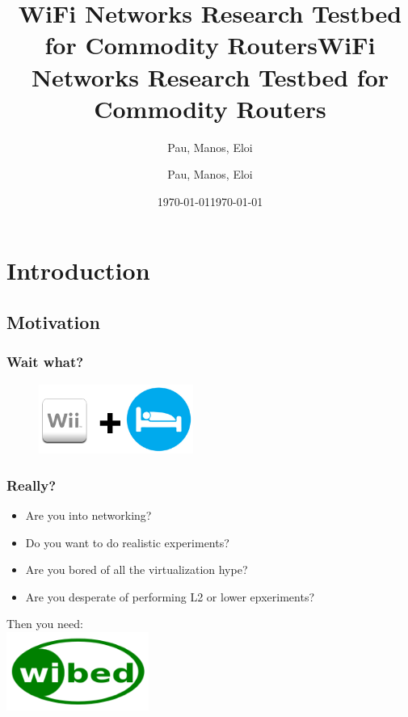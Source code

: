 \documentclass[usepdftitle=false,13pt]{beamer}
\title[WiFi Networks Research Testbed for Commodity Routers]{WiFi Networks Research Testbed for Commodity Routers}
\author[{Pau, Manos, Eloi}]{Pau, Manos, Eloi}
\institute[{UPC, Guifi.net}]{UPC, Guifi.net}
\date[\today]{\today}
\begin{document}
\title[WiBed\hspace{20em}\insertframenumber/\inserttotalframenumber]{WiFi Networks Research Testbed for Commodity Routers}  
\author[Pau@Guifi,\{Manos,Eloi\}@UPC ]{ Pau, Manos, Eloi\\
 }

\date{\today} 

\frame{\titlepage}




\section{Introduction}
\subsection{Motivation}

\begin{frame}\frametitle{Wait what?}

\begin{figure}[h!]
\begin{center}
\includegraphics[width=0.45\textwidth]{pic/Wiibed}
\end{center}
\end{figure}

\end{frame}



\begin{frame}\frametitle{Really?}

	\begin{itemize}
		\item Are you into networking?
		\pause
		\item Do you want to do realistic experiments?
		\pause
		\item Are you bored of all the virtualization hype?
		\pause
		\item Are you desperate of performing L2 or lower epxeriments?
	\end{itemize}
	\pause
	\begin{center}
	Then you need:\\
	\includegraphics[width=0.35\textwidth]{pic/wibed-logo}
	\end{center}

\end{frame}
\end{document}

